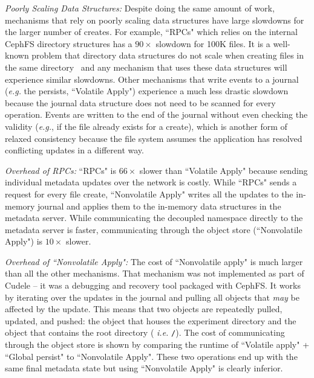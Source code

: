 {\it Poorly Scaling Data Structures:} Despite doing the same amount of work,
mechanisms that rely on poorly scaling data structures have large slowdowns for
the larger number of creates. For example, ``RPCs" which relies on the internal
CephFS directory structures has a \(90\times\) slowdown for 100K files. It is a
well-known problem that directory data structures do not scale when creating
files in the same directory~\cite{ren:sc2014-indexfs} and any mechanism that
uses these data structures will experience similar slowdowns. Other mechanisms
that write events to a journal ({\it e.g.} the persists, ``Volatile Apply")
experience a much less drastic slowdown because the journal data structure does
not need to be scanned for every operation. Events are written to the end of
the journal without even checking the validity ({\it e.g.}, if the file already
exists for a create), which is another form of relaxed consistency because the
file system assumes the application has resolved conflicting updates in a
different way.

{\it Overhead of RPCs:} ``RPCs" is \(66\times\) slower than ``Volatile
Apply" because sending individual metadata updates over the network is costly.
While ``RPCs" sends a request for every file create, ``Nonvolatile Apply"
writes all the updates to the in-memory journal and applies them to the
in-memory data structures in the metadata server. While communicating the
decoupled namespace directly to the metadata server is faster, communicating
through the object store (``Nonvolatile Apply") is \(10\times\) slower.

{\it Overhead of ``Nonvolatile Apply":} The cost of ``Nonvolatile
apply" is much larger than all the other mechanisms.  That mechanism was not
implemented as part of Cudele -- it was a debugging and recovery tool packaged
with CephFS. It works by iterating over the updates in the journal and pulling
all objects that {\it may} be affected by the update.  This means that two
objects are repeatedly pulled, updated, and pushed: the object that houses the
experiment directory and the object that contains the root directory ({\it
i.e.} \texttt{/}).  The cost of communicating through the object store is shown
by comparing the runtime of ``Volatile apply" + ``Global persist" to
``Nonvolatile Apply". These two operations end up with the same final metadata
state but using ``Nonvolatile Apply" is clearly inferior.

